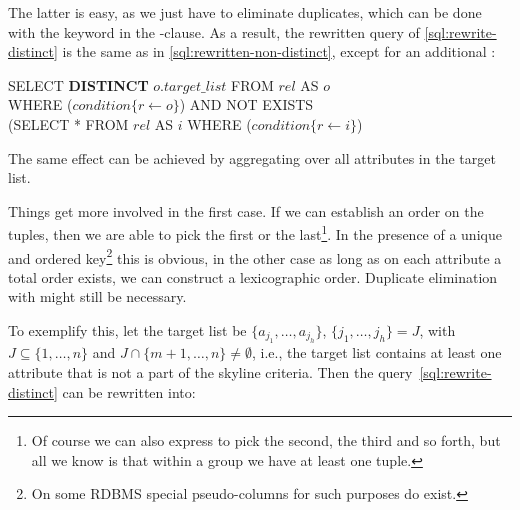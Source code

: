 \noindent
The latter is easy, as we just have to eliminate duplicates, which can be
done with the  keyword in the
-clause. As a result, the rewritten query of
\eqref{sql:rewrite-distinct} is the same as in \eqref{sql:rewritten-non-distinct},
except for an additional :
%
\begin{sql}
\newcommand\abox[1]{\hbox to 2.5em{#1\hfil}}%
\newcommand\bbox[1]{\hbox to 2em{#1\hfil}}%
SELECT \textbf{DISTINCT} $o.target\_list$ FROM $rel$ AS $o$ \\
WHERE ($condition\{r \gets o\}$) AND NOT EXISTS \\
(SELECT * FROM $rel$ AS $i$ WHERE ($condition\{r \gets i\}$) \ellipsis
\end{sql}
%
The same effect can be achieved by aggregating over all attributes in
the target list.

\bigskip
Things get more involved in the first case.  If we can establish an
order on the tuples, then we are able to pick the first or the
last\footnote{Of course we can also express to pick the second, the
third and so forth, but all we know is that within a group we have at
least one tuple.}.  In the presence of a unique and ordered
key\footnote{On some RDBMS special pseudo-columns for such purposes do
exist.} this is obvious, in the other case as long as on each
attribute a total order exists, we can construct a lexicographic
order.  Duplicate elimination with
 might still be necessary.

To exemplify this, let the target list be $\{a_{j_1}, \ldots,
a_{j_h}\}$, $\{j_1, \ldots, j_h\} = J$, with $J \subseteq \{1, \ldots,
n\}$ and $J \cap \{m+1, \ldots, n\} \neq \emptyset$, i.e., the target
list contains at least one attribute that is not a part of the skyline
criteria. Then the query~\eqref{sql:rewrite-distinct} can be rewritten
into:

